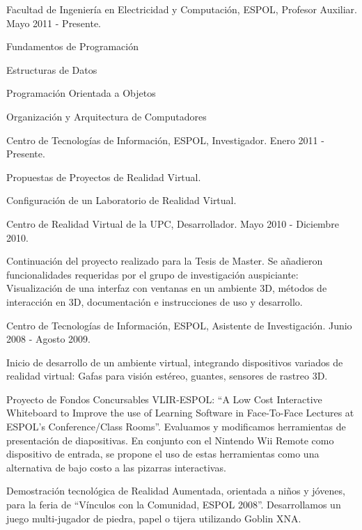 \documentclass[a4paper]{article}
\renewenvironment{itemize}{
  \begin{list}{}{
    \setlength{\leftmargin}{1.5em}
  }
}{
  \end{list}
}
\begin{document}
\begin{itemize}
  \item Facultad de Ingeniería en Electricidad y Computación, ESPOL, Profesor Auxiliar. Mayo 2011 - Presente.
    \begin{itemize}
      \item Fundamentos de Programación
      \item Estructuras de Datos
      \item Programación Orientada a Objetos
      \item Organización y Arquitectura de Computadores
    \end{itemize}
  \item Centro de Tecnologías de Información, ESPOL, Investigador. Enero 2011 - Presente.
    \begin{itemize}
      \item Propuestas de Proyectos de Realidad Virtual.
      \item Configuración de un Laboratorio de Realidad Virtual.
    \end{itemize}
  \item Centro de Realidad Virtual de la UPC, Desarrollador. Mayo 2010 - Diciembre 2010.
    \begin{itemize}
      \item Continuación del proyecto realizado para la Tesis de Master. Se añadieron funcionalidades requeridas por el grupo de investigación auspiciante: Visualización de una interfaz con ventanas en un ambiente 3D, métodos de interacción en 3D, documentación e instrucciones de uso y desarrollo.
    \end{itemize}
  \item Centro de Tecnologías de Información, ESPOL, Asistente de Investigación. Junio 2008 - Agosto 2009.
    \begin{itemize}
      \item Inicio de desarrollo de un ambiente virtual, integrando dispositivos variados de realidad virtual: Gafas para visión estéreo, guantes, sensores de rastreo 3D.
      \item Proyecto de Fondos Concursables VLIR-ESPOL: ``A Low Cost Interactive Whiteboard to Improve the use of Learning Software in Face-To-Face Lectures at ESPOL's Conference/Class Rooms''. Evaluamos y modificamos herramientas de presentación de diapositivas. En conjunto con el Nintendo Wii Remote como dispositivo de entrada, se propone el uso de estas herramientas como una alternativa de bajo costo a las pizarras interactivas.
      \item Demostración tecnológica de Realidad Aumentada, orientada a niños y jóvenes, para la feria de ``Vínculos con la Comunidad, ESPOL 2008''. Desarrollamos un juego multi-jugador de piedra, papel o tijera utilizando Goblin XNA.

\end{itemize}
\end{itemize}
\end{document}
